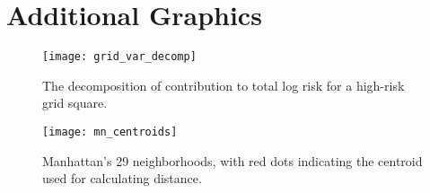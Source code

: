 \clearpage
\label{AppendixA}
\vspace{-1.75cm}
\section{Additional Graphics}


\begin{figure}[h!]
  \centering
  \caption{The decomposition of contribution to total log risk for a high-risk grid square.}
  \texttt{[image: grid\_var\_decomp]}
\end{figure}


 \begin{figure}[h!]
   \centering
     \texttt{[image: mn\_centroids]}
     \caption{Manhattan's 29 neighborhoods, with red dots indicating the centroid used for calculating distance.}
\end{figure}
